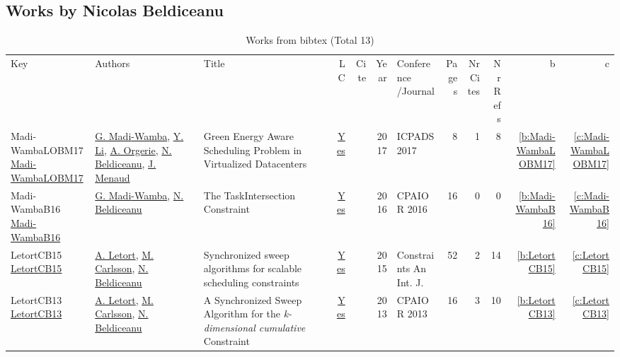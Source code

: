 \subsection{Works by Nicolas Beldiceanu}
\label{sec:a129}
{\scriptsize
\begin{longtable}{>{\raggedright\arraybackslash}p{3cm}>{\raggedright\arraybackslash}p{6cm}>{\raggedright\arraybackslash}p{6.5cm}rrrp{2.5cm}rrrrr}
\rowcolor{white}\caption{Works from bibtex (Total 13)}\\ \toprule
\rowcolor{white}Key & Authors & Title & LC & Cite & Year & \shortstack{Conference\\/Journal} & Pages & \shortstack{Nr\\Cites} & \shortstack{Nr\\Refs} & b & c \\ \midrule\endhead
\bottomrule
\endfoot
Madi-WambaLOBM17 \href{https://doi.org/10.1109/ICPADS.2017.00089}{Madi-WambaLOBM17} & \hyperref[auth:a324]{G. Madi{-}Wamba}, \hyperref[auth:a723]{Y. Li}, \hyperref[auth:a724]{A. Orgerie}, \hyperref[auth:a129]{N. Beldiceanu}, \hyperref[auth:a725]{J. Menaud} & Green Energy Aware Scheduling Problem in Virtualized Datacenters & \href{works/Madi-WambaLOBM17.pdf}{Yes} & \cite{Madi-WambaLOBM17} & 2017 & ICPADS 2017 & 8 & 1 & 8 & \ref{b:Madi-WambaLOBM17} & \ref{c:Madi-WambaLOBM17}\\
Madi-WambaB16 \href{https://doi.org/10.1007/978-3-319-33954-2\_18}{Madi-WambaB16} & \hyperref[auth:a324]{G. Madi{-}Wamba}, \hyperref[auth:a129]{N. Beldiceanu} & The TaskIntersection Constraint & \href{works/Madi-WambaB16.pdf}{Yes} & \cite{Madi-WambaB16} & 2016 & CPAIOR 2016 & 16 & 0 & 0 & \ref{b:Madi-WambaB16} & \ref{c:Madi-WambaB16}\\
LetortCB15 \href{https://doi.org/10.1007/s10601-014-9172-8}{LetortCB15} & \hyperref[auth:a128]{A. Letort}, \hyperref[auth:a91]{M. Carlsson}, \hyperref[auth:a129]{N. Beldiceanu} & Synchronized sweep algorithms for scalable scheduling constraints & \href{works/LetortCB15.pdf}{Yes} & \cite{LetortCB15} & 2015 & Constraints An Int. J. & 52 & 2 & 14 & \ref{b:LetortCB15} & \ref{c:LetortCB15}\\
LetortCB13 \href{https://doi.org/10.1007/978-3-642-38171-3\_10}{LetortCB13} & \hyperref[auth:a128]{A. Letort}, \hyperref[auth:a91]{M. Carlsson}, \hyperref[auth:a129]{N. Beldiceanu} & A Synchronized Sweep Algorithm for the \emph{k-dimensional cumulative} Constraint & \href{works/LetortCB13.pdf}{Yes} & \cite{LetortCB13} & 2013 & CPAIOR 2013 & 16 & 3 & 10 & \ref{b:LetortCB13} & \ref{c:LetortCB13}\\

\end{longtable}}
